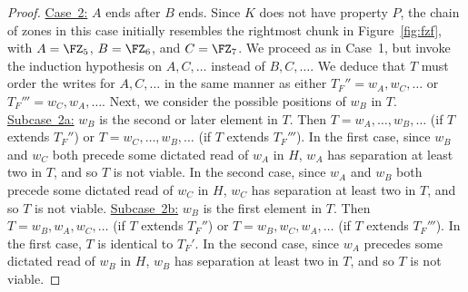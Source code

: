 \begin{lemma}
\begin{proof}
\noindent\underline{Case~2:} $A$ ends after $B$ ends.
Since $K$ does not have property $P$, the chain of zones in this case initially resembles the
rightmost chunk in Figure~\ref{fig:fzf}, with $A = \FZ_5$, $B = \FZ_6$, and $C = \FZ_7$.
We proceed as in Case~1, but invoke the induction hypothesis on 
$A,C, \ldots$ instead of $B,C,\ldots$.
We deduce that $T$ must order the writes for $A,C, \ldots$ in the same manner as either
$T_F'' = w_A,w_C,\ldots$ or $T_F''' = w_C,w_A,\ldots$.
Next, we consider the possible positions of $w_B$ in $T$.
\newline\noindent\underline{Subcase~2a:} $w_B$ is the second or later element in $T$.
Then $T = w_A, \ldots, w_B, \ldots$ (if $T$ extends $T_F''$) or $T = w_C, \ldots, w_B, \ldots$ (if $T$ extends $T_F'''$).
In the first case, since $w_B$ and $w_C$ both precede some dictated read of $w_A$ in $H$,
$w_A$ has separation at least two in $T$, and so $T$ is not viable.
In the second case, since $w_A$ and $w_B$ both precede some dictated read of $w_C$ in $H$,
$w_C$ has separation at least two in $T$, and so $T$ is not viable.
\newline\noindent\underline{Subcase~2b:} $w_B$ is the first element in $T$.
Then $T = w_B, w_A, w_C, \ldots$ (if $T$ extends $T_F''$) or $T = w_B, w_C, w_A, \ldots$ (if $T$ extends $T_F'''$).
In the first case, $T$ is identical to $T_F'$.
In the second case, since $w_A$ precedes some dictated read of $w_B$ in $H$,
$w_B$ has separation at least two in $T$, and so $T$ is not viable.
\end{proof}
\end{lemma}


